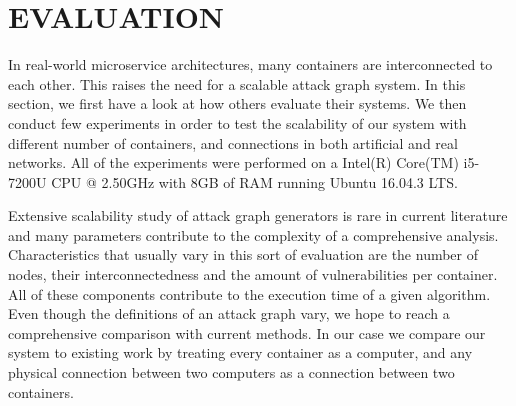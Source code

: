 \documentclass[letterpaper, 10 pt, conference]{ieeeconf}  %
\begin{document}
\section{EVALUATION}

In real-world microservice architectures, many containers are interconnected to each other. This raises the need for a scalable attack graph system. In this section, we first have a look at how others evaluate their systems. We then conduct few experiments in order to test the scalability of our system with different number of containers, and connections in both artificial and real networks. All of the experiments were performed on a Intel(R) Core(TM) i5-7200U CPU @ 2.50GHz with 8GB of RAM running Ubuntu 16.04.3 LTS.

Extensive scalability study of attack graph generators  is rare in current literature and many parameters contribute to the complexity of a comprehensive analysis. Characteristics that usually vary in this sort of evaluation are the number of nodes, their interconnectedness and the amount of vulnerabilities per container. All of these components contribute to the execution time of a given algorithm. Even though the definitions of an attack graph vary, we hope to reach a comprehensive comparison with current methods. In our case we compare our system to existing work by treating every container as a computer, and any physical connection between two computers as a connection between two containers. 
\end{document}
